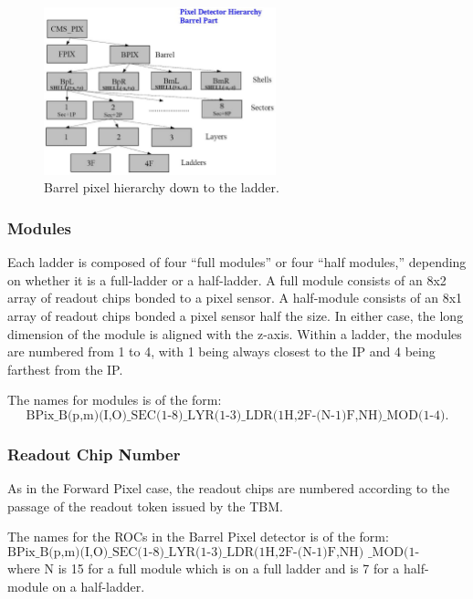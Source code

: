 \documentclass{cmspaper}
\begin{document}
\begin{figure}[hbtp] 
  \begin{center} 
        \includegraphics[width =0.6\textwidth]{barrel_hierarchy.eps} 
    \caption{Barrel pixel hierarchy down to the ladder.} 
    \label{figure:bpix_hier1} 
  \end{center} 
\end{figure} 

\subsubsection{Modules}

Each ladder is composed of four ``full modules'' or four ``half modules,''
depending on whether it is a full-ladder or a half-ladder. 
A full module consists of an 8x2 array of readout chips bonded to a pixel sensor. 
A half-module consists of an 8x1 array of readout chips bonded a pixel sensor half the size.
In either case, the long dimension of the module is aligned with the z-axis. 
Within a ladder, the modules are numbered from 1 to 4, 
with 1 being always closest to the IP and 4 being farthest from the IP.   

The names for modules is of the form:
\begin{displaymath}
\mbox{BPix\_B(p,m)(I,O)\_SEC(1-8)\_LYR(1-3)\_LDR(1H,2F-(N-1)F,NH)\_MOD(1-4).}
\end{displaymath}


\subsubsection{Readout Chip Number}

As in the Forward Pixel case, the readout chips are numbered 
according to the passage of the readout token issued by the TBM.

The names for the ROCs in the Barrel Pixel detector is of the form:
\begin{displaymath}
\mbox{BPix\_B(p,m)(I,O)\_SEC(1-8)\_LYR(1-3)\_LDR(1H,2F-(N-1)F,NH)
\_MOD(1-4)\_ROC(0-(7,15)),}
\end{displaymath}
where N is 15 for a full module which is on a full ladder and is 7
for a half-module on a half-ladder.
\end{document}
